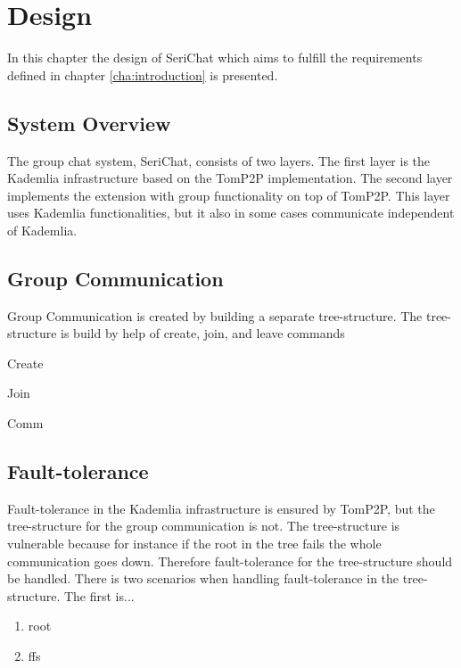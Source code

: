 \chapter{Design}
\label{cha:design}
In this chapter the design of SeriChat which aims to fulfill the requirements defined in chapter \ref{cha:introduction} is presented.

\section{System Overview}
The group chat system, SeriChat, consists of two layers. The first layer is the Kademlia infrastructure based on the TomP2P implementation. The second layer implements the extension with group functionality on top of TomP2P. This layer uses Kademlia functionalities, but it also in some cases communicate independent of Kademlia. 

\section{Group Communication}
Group Communication is created by building a separate tree-structure. The tree-structure is build by help of create, join, and leave commands

Create

Join

Comm

\section{Fault-tolerance}
Fault-tolerance in the Kademlia infrastructure is ensured by TomP2P, but the tree-structure for the group communication is not. The tree-structure is vulnerable because for instance if the root in the tree fails the whole communication goes down. Therefore fault-tolerance for the tree-structure should be handled. There is two scenarios when handling fault-tolerance in the tree-structure. The first is... 
\begin{enumerate}
	\item root
	\item ffs
\end{enumerate}

